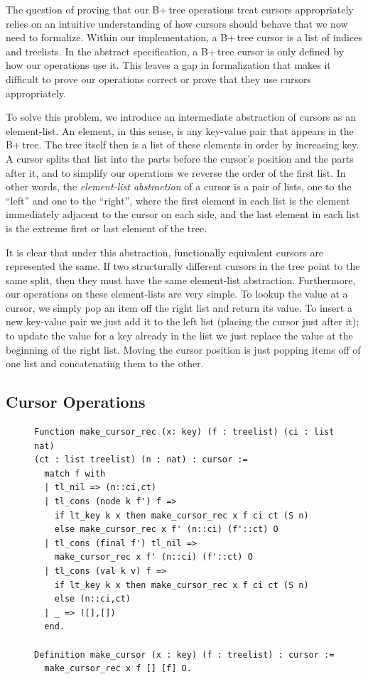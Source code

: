 \documentclass[a4paper,12pt]{article}
\begin{document}
The question of proving that our B+\,tree operations treat cursors appropriately relies on an intuitive understanding of how cursors should behave that we now need to formalize. Within our implementation, a B+\,tree cursor is a list of indices and treelists. In the abstract specification, a B+\,tree cursor is only defined by how our operations use it. This leaves a gap in formalization that makes it difficult to prove our operations correct or prove that they use cursors appropriately.

To solve this problem, we introduce an intermediate abstraction of cursors as an element-list. An element, in this sense, is any key-value pair that appears in the B+\,tree. The tree itself then is a list of these elements in order by increasing key. A cursor splits that list into the parts before the cursor’s position and the parts after it, and to simplify our operations we reverse the order of the first list. In other words, the \textit{element-list abstraction} of a cursor is a pair of lists, one to the “left” and one to the “right”, where the first element in each list is the element immediately adjacent to the cursor on each side, and the last element in each list is the extreme first or last element of the tree.

It is clear that under this abstraction, functionally equivalent cursors are represented the same. If two structurally different cursors in the tree point to the same split, then they must have the same element-list abstraction. Furthermore, our operations on these element-lists are very simple. To lookup the value at a cursor, we simply pop an item off the right list and return its value. To insert a new key-value pair we just add it to the left list (placing the cursor just after it); to update the value for a key already in the list we just replace the value at the beginning of the right list. Moving the cursor position is just popping items off of one list and concatenating them to the other.

\subsection{Cursor Operations} \label{subsec:cursorop}

\begin{figure}[h]
\begin{singlespace}
\begin{verbatim}
Function make_cursor_rec (x: key) (f : treelist) (ci : list nat)
(ct : list treelist) (n : nat) : cursor :=
  match f with
  | tl_nil => (n::ci,ct)
  | tl_cons (node k f') f =>
    if lt_key k x then make_cursor_rec x f ci ct (S n)
    else make_cursor_rec x f' (n::ci) (f'::ct) O
  | tl_cons (final f') tl_nil =>
    make_cursor_rec x f' (n::ci) (f'::ct) O
  | tl_cons (val k v) f =>
    if lt_key k x then make_cursor_rec x f ci ct (S n)
    else (n::ci,ct)
  | _ => ([],[])
  end.

Definition make_cursor (x : key) (f : treelist) : cursor :=
  make_cursor_rec x f [] [f] O.
\end{verbatim}
\end{singlespace}
\end{figure}
\end{document}
